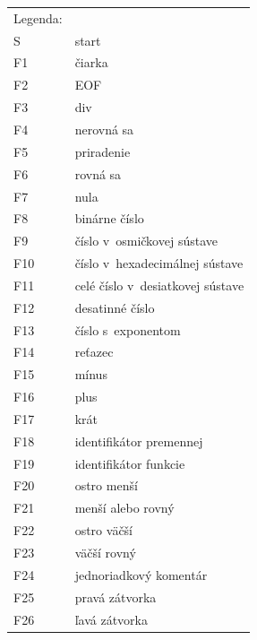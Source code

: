 \documentclass [11pt, a4paper]{article}
\begin{document}
\begin{table}[h]
\begin{tabular}{l l}
Legenda:& \\
S~&\qquad start\\
F1 &\qquad čiarka\\
F2 &\qquad EOF\\
F3 &\qquad div\\
F4 &\qquad nerovná sa \\
F5 &\qquad priradenie\\
F6 &\qquad rovná sa\\
F7 &\qquad nula\\
F8 &\qquad binárne číslo\\
F9 & \qquad číslo v~osmičkovej sústave\\
F10&\qquad číslo v~hexadecimálnej sústave\\
F11&\qquad celé číslo v~desiatkovej sústave\\
F12&\qquad desatinné číslo\\
F13&\qquad číslo s~exponentom\\
F14&\qquad reťazec\\
F15& \qquad mínus\\
F16&\qquad plus\\
F17&\qquad krát\\
F18&\qquad identifikátor premennej\\
F19&\qquad identifikátor funkcie\\
F20&\qquad ostro menší\\
F21&\qquad menší alebo rovný\\
F22&\qquad ostro väčší\\
F23&\qquad väčší rovný\\
F24&\qquad jednoriadkový komentár\\
F25&\qquad pravá zátvorka\\
F26&\qquad ľavá zátvorka\\
\end{tabular}
\end{table}
\end{document}
